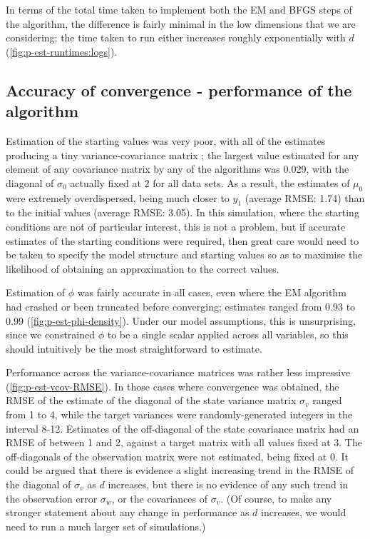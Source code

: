 \documentclass[10pt,fleqn]{article}
\begin{document}
In terms of the total time taken to implement both the EM and BFGS steps of the algorithm, the difference is fairly minimal in the low dimensions that we are considering; the time taken to run either increases roughly exponentially with $d$ (\autoref{fig:p-est-runtimes:logs}).

\subsection{Accuracy of convergence - performance of the algorithm}
Estimation of the starting values was very poor, with all of the estimates producing a tiny variance-covariance matrix ; the largest value estimated for any element of any covariance matrix by any of the algorithms was 0.029, with the diagonal of $\sigma_0$ actually fixed at 2 for all data sets. As a result, the estimates of $\mu_0$ were extremely overdispersed, being much closer to $y_1$ (average RMSE: 1.74) than to the initial values (average RMSE: 3.05). In this simulation, where the starting conditions are not of particular interest, this is not a problem, but if accurate estimates of the starting conditions were required, then great care would need to be taken to specify the model structure and starting values so as to maximise the likelihood of obtaining an approximation to the correct values. 

Estimation of $\phi$ was fairly accurate in all cases, even where the EM algorithm had crashed or been truncated before converging; estimates ranged from 0.93 to 0.99 (\autoref{fig:p-est-phi-density}). Under our model assumptions, this is unsurprising, since we constrained $\phi$ to be a single scalar applied across all variables, so this should intuitively be the most straightforward to estimate.

Performance across the variance-covariance matrices was rather less impressive (\autoref{fig:p-est-vcov-RMSE}). In those cases where convergence was obtained, the RMSE of the estimate of the diagonal of the state variance matrix $\sigma_v$ ranged from 1 to 4, while the target variances were randomly-generated integers in the interval 8-12. Estimates of the off-diagonal of the state covariance matrix had an RMSE of between 1 and 2, against a target matrix with all values fixed at 3. The off-diagonals of the observation matrix were not estimated, being fixed at 0. It could be argued that there is evidence a slight increasing trend in the RMSE of the diagonal of $\sigma_v$ as $d$ increases, but there is no evidence of any such trend in the observation error $\sigma_w$, or the covariances of $\sigma_v$. (Of course, to make any stronger statement about any change in performance as $d$ increases, we would need to run a much larger set of simulations.)
\end{document}
